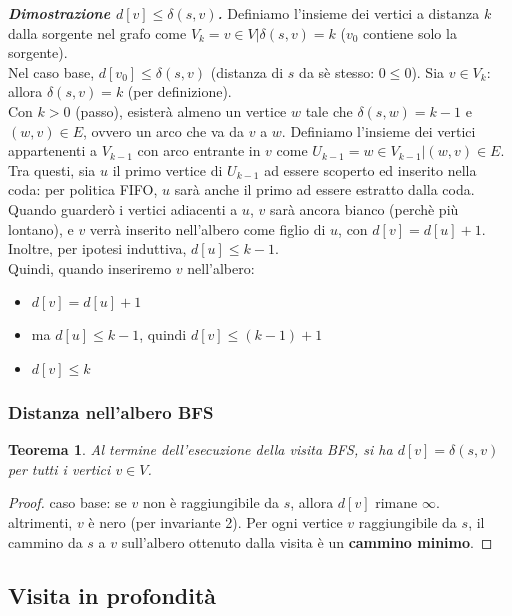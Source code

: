 \documentclass[11pt]{article}
\newtheorem*{theorem}{Teorema}
\begin{document}
\textit{\textbf{Dimostrazione $d[v] \leq \delta(s,v)$.}} Definiamo l'insieme dei vertici a distanza $k$ dalla sorgente nel grafo 
come $V_k={v\in V|\delta(s,v)=k}$ ($v_0$ contiene solo la sorgente).\\ Nel caso base, $d[v_0]\leq \delta(s,v)$ (distanza di 
$s$ da sè stesso: $0\leq 0$). Sia $v\in V_k$: allora $\delta(s,v)=k$ (per definizione).\\ Con $k>0$ (passo), esisterà almeno 
un vertice $w$ tale che $\delta(s,w)=k-1$ e $(w,v)\in E$, ovvero un arco che va da $v$ a $w$. Definiamo l'insieme dei vertici 
appartenenti a $V_{k-1}$ con arco entrante in $v$ come $U_{k-1}={w\in V_{k-1}|(w,v)\in E}$. Tra questi, sia $u$ il primo 
vertice di $U_{k-1}$ ad essere scoperto ed inserito nella coda: per politica FIFO, $u$ sarà anche il primo ad essere estratto
dalla coda. Quando guarderò i vertici adiacenti a $u$, $v$ sarà ancora bianco (perchè più lontano), e $v$ verrà inserito 
nell'albero come figlio di $u$, con $d[v]=d[u]+1$. Inoltre, per ipotesi induttiva, $d[u]\leq k-1$.\\
Quindi, quando inseriremo $v$ nell'albero:
\begin{itemize}
    \item $d[v]=d[u]+1$
    \item ma $d[u]\leq k-1$, quindi $d[v]\leq (k-1)+1$
    \item $d[v]\leq k$
\end{itemize}
\subsubsection{Distanza nell'albero BFS}
\begin{theorem}
    Al termine dell'esecuzione della visita BFS, si ha $d[v]=\delta(s,v)$ per tutti i vertici $v\in V$.
\end{theorem}
\begin{proof}
    caso base: se $v$ non è raggiungibile da $s$, allora $d[v]$ rimane $\infty$.\\
    altrimenti, $v$ è nero (per invariante 2). Per ogni vertice $v$ raggiungibile da $s$, il cammino da $s$ a $v$ sull'albero 
    ottenuto dalla visita è un \textbf{cammino minimo}.
\end{proof}
\subsection{Visita in profondità}
\end{document}
